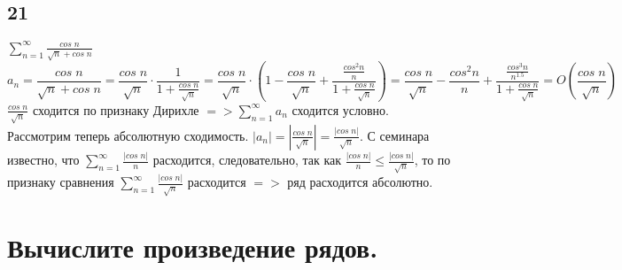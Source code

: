 \documentclass[a4paper,fleqn]{article}
\begin{document}


    \subsection*{21}
    $\displaystyle \sum\limits_{n=1}^{\infty} \frac{cos \; n}{\sqrt{n} + cos \; n}$ \\
    \begin{equation*} a_n = \frac{cos \; n}{\sqrt{n} + cos \; n} = \frac{cos \; n}{\sqrt{n}} \cdot \frac{1}{1+\frac{cos\; n}{\sqrt{n}}} = \frac{cos\; n}{\sqrt{n}} \cdot (1 - \frac{cos\; n}{\sqrt{n}} + \frac{\frac{cos^2n}{n}}{1 + \frac{cos\; n}{\sqrt{n}}}) = \frac{cos\; n}{\sqrt{n}} - \frac{cos^2n}{n} + \frac{\frac{cos^3n}{n^{1.5}}}{1 + \frac{cos\; n}{\sqrt{n}}} = O(\frac{cos \; n}{\sqrt{n}})\end{equation*}
    $\displaystyle \frac{cos \; n}{\sqrt{n}}$ сходится по признаку Дирихле $\displaystyle => \sum\limits_{n=1}^{\infty} a_n$ сходится условно. \\
    Рассмотрим теперь абсолютную сходимость. $\displaystyle |a_n| = \left|\frac{cos \; n}{\sqrt{n}}\right| = \frac{|cos \; n|}{\sqrt{n}}$. С семинара известно, что $\displaystyle \sum\limits_{n = 1}^{\infty} \frac{|cos\; n|}{n}$ расходится, следовательно, так как $\displaystyle \frac{|cos\; n|}{n} \leq \frac{|cos\; n|}{\sqrt{n}}$, то по признаку сравнения $\sum\limits_{n = 1}^{\infty} \frac{|cos\; n|}{\sqrt{n}}$ расходится $\displaystyle =>$ ряд расходится абсолютно. \\


    
    \section*{Вычислите произведение рядов.}

\end{document}
